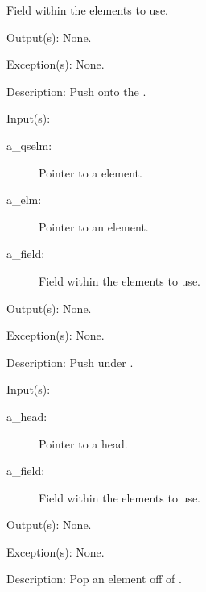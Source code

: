 \begin{capi}
\begin{capilist}
\begin{description}
			Field within the  elements to use.
		\end{description}
	\item[Output(s): ] None.
	\item[Exception(s): ] None.
	\item[Description: ]
		Push  onto the .
	\end{capilist}
\label{qs_under_push}
	\begin{capilist}
	\item[Input(s): ]
		\begin{description}\item[]
		\item[a\_qselm: ]
			Pointer to a  element.
		\item[a\_elm: ]
			Pointer to an element.
		\item[a\_field: ]
			Field within the  elements to use.
		\end{description}
	\item[Output(s): ] None.
	\item[Exception(s): ] None.
	\item[Description: ]
		Push  under .
	\end{capilist}
\label{qs_pop}
	\begin{capilist}
	\item[Input(s): ]
		\begin{description}\item[]
		\item[a\_head: ]
			Pointer to a \classname{qs} head.
		\item[a\_field: ]
			Field within the  elements to use.
		\end{description}
	\item[Output(s): ] None.
	\item[Exception(s): ] None.
	\item[Description: ]
		Pop an element off of \cvar{a\_head}.
	\end{capilist}
\label{qs_foreach}

\end{capi}
